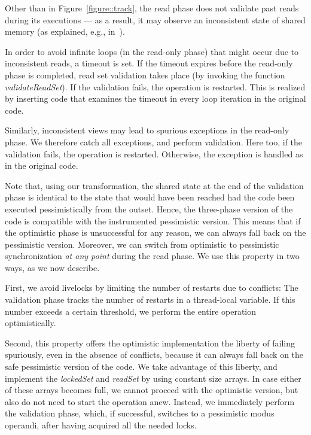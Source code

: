Other than in Figure~\ref{figure::track}, the read phase does not validate past reads during its executions ---
as a result, it may observe an inconsistent state of shared memory (as explained, e.g., in~\cite{HLR:SLCA2010}).
%

In order to avoid infinite loops (in the read-only phase) that might occur due to inconsistent reads, a timeout is set.
If the timeout expires before the read-only phase is completed, read set
validation takes place (by invoking the function \emph{validateReadSet}). If the validation fails, the operation is restarted.
This is realized by inserting code that examines the timeout in every loop iteration in the original code.

Similarly, inconsistent views may lead to spurious exceptions in the read-only phase. We therefore catch all exceptions, and
perform validation. Here too, if the validation fails, the operation is restarted. Otherwise, the exception is handled as in
the original code.


Note that, using our transformation, the shared state at the end of the validation phase
is identical to the state that would have been reached had the code been executed pessimistically from
the outset. Hence, the three-phase version of the code is compatible with the instrumented
pessimistic version. This means that if the optimistic phase is unsuccessful for any reason, we can always
fall back on the pessimistic version. Moreover, we can switch from optimistic to pessimistic synchronization
\emph{at any point} during the read phase.
We use this property in two ways, as we now describe.

First, we avoid livelocks by limiting the number of restarts due to conflicts:
The validation phase tracks the number of restarts in a thread-local variable.
If this number exceeds a certain threshold, we perform the entire operation optimistically.

Second, this property offers the optimistic implementation the liberty of
failing spuriously, even in the absence of conflicts, because it can always fall back on the safe pessimistic version
of the code.
We take advantage of this liberty, and implement the \emph{lockedSet} and \emph{readSet} by using constant size arrays.
In case either of these arrays becomes full, we cannot proceed with the optimistic version, but also
do not need to start the operation anew.
Instead, we immediately perform the validation phase, which, if successful, switches to a pessimistic modus operandi, after having acquired all the needed locks.
